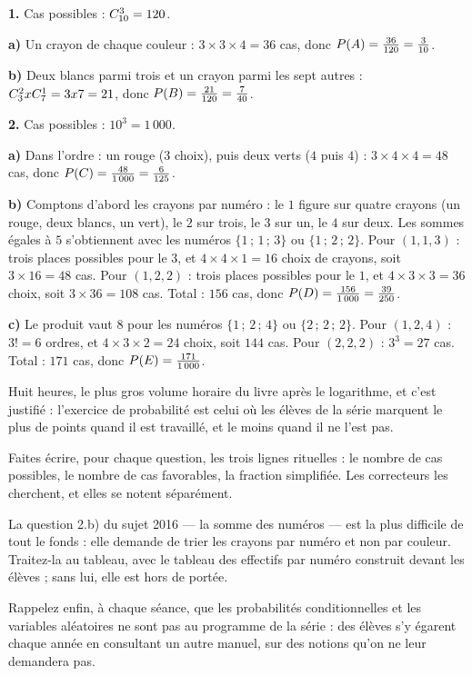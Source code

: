 \begin{corrige}
\textbf{1.} Cas possibles : $\combi{3}{10} = 120$.

\textbf{a)} Un crayon de chaque couleur : $3\times3\times4 = 36$ cas, donc
$\proba{A} = \frac{36}{120} = \frac{3}{10}$.

\textbf{b)} Deux blancs parmi trois et un crayon parmi les sept autres :
$\combi{2}{3}\times\combi{1}{7} = 3\times7 = 21$, donc
$\proba{B} = \frac{21}{120} = \frac{7}{40}$.

\textbf{2.} Cas possibles : $10^{3} = 1\,000$.

\textbf{a)} Dans l'ordre : un rouge ($3$ choix), puis deux verts ($4$ puis
$4$) : $3\times4\times4 = 48$ cas, donc
$\proba{C} = \frac{48}{1\,000} = \frac{6}{125}$.

\textbf{b)} Comptons d'abord les crayons par numéro : le $1$ figure sur
quatre crayons (un rouge, deux blancs, un vert), le $2$ sur trois, le $3$
sur un, le $4$ sur deux. Les sommes égales à $5$ s'obtiennent avec les
numéros $\{1\,;\,1\,;\,3\}$ ou $\{1\,;\,2\,;\,2\}$.
Pour $(1,1,3)$ : trois places possibles pour le $3$, et
$4\times4\times1 = 16$ choix de crayons, soit $3\times16 = 48$ cas.
Pour $(1,2,2)$ : trois places possibles pour le $1$, et
$4\times3\times3 = 36$ choix, soit $3\times36 = 108$ cas.
Total : $156$ cas, donc $\proba{D} = \frac{156}{1\,000} = \frac{39}{250}$.

\textbf{c)} Le produit vaut $8$ pour les numéros $\{1\,;\,2\,;\,4\}$ ou
$\{2\,;\,2\,;\,2\}$.
Pour $(1,2,4)$ : $3! = 6$ ordres, et $4\times3\times2 = 24$ choix, soit
$144$ cas. Pour $(2,2,2)$ : $3^{3} = 27$ cas.
Total : $171$ cas, donc $\proba{E} = \frac{171}{1\,000}$.
\end{corrige}

\begin{notepourlaclasse}
Huit heures, le plus gros volume horaire du livre après le logarithme, et
c'est justifié : l'exercice de probabilité est celui où les élèves de la
série marquent le plus de points quand il est travaillé, et le moins quand
il ne l'est pas.

Faites écrire, pour chaque question, les trois lignes rituelles : le nombre
de cas possibles, le nombre de cas favorables, la fraction simplifiée. Les
correcteurs les cherchent, et elles se notent séparément.

La question 2.b) du sujet 2016 — la somme des numéros — est la plus
difficile de tout le fonds : elle demande de trier les crayons par numéro et
non par couleur. Traitez-la au tableau, avec le tableau des effectifs par
numéro construit devant les élèves ; sans lui, elle est hors de portée.

Rappelez enfin, à chaque séance, que les probabilités conditionnelles et les
variables aléatoires ne sont pas au programme de la série : des élèves s'y
égarent chaque année en consultant un autre manuel, sur des notions qu'on ne
leur demandera pas.
\end{notepourlaclasse}
